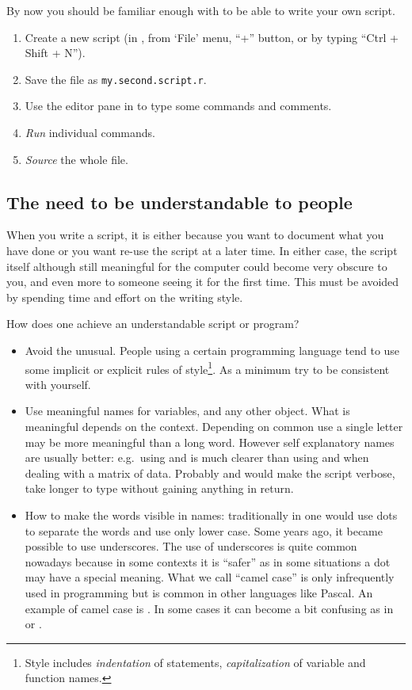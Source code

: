 \documentclass[krantz2]{krantz}\usepackage{knitr}%
\begin{document}
\begin{playground}
By now you should be familiar enough with \Rlang to be able to write your own script.
\begin{enumerate}
  \item Create a new \Rpgrm script (in \RStudio, from `File' menu, ``+'' button, or by typing ``Ctrl + Shift + N'').
  \item Save the file as \texttt{my.second.script.r}.
  \item Use the editor pane in \RStudio to type some \Rpgrm commands and comments.
  \item \emph{Run} individual commands.
  \item \emph{Source} the whole file.
\end{enumerate}
\end{playground}

\subsection{The need to be understandable to people}\label{sec:script:readability}

When you write a script, it is either because you want to document what you have done or you want re-use the script at a later time. In either case, the script itself although still meaningful for the computer could become very obscure to you, and even more to someone seeing it for the first time. This must be avoided by spending time and effort on the writing style.

How does one achieve an understandable script or program?
\begin{itemize}
  \item Avoid the unusual. People using a certain programming language tend to use some implicit or explicit rules of style\footnote{Style includes \textit{indentation} of statements, \textit{capitalization} of variable and function names.}. As a minimum try to be consistent with yourself.
  \item Use meaningful names for variables, and any other object. What is meaningful depends on the context. Depending on common use a single letter may be more meaningful than a long word. However self explanatory names are usually better: e.g.\ using  and  is much clearer than using  and  when dealing with a matrix of data. Probably  and  would make the script verbose, take longer to type without gaining anything in return.
  \item How to make the words visible in names: traditionally in \Rlang one would use dots to separate the words and use only lower case. Some years ago, it became possible to use underscores. The use of underscores is quite common nowadays because in some contexts it is ``safer'' as in some situations a dot may have a special meaning. What we call ``camel case'' is only infrequently used in \Rlang programming but is common in other languages like Pascal. An example of camel case is . In some cases it can become a bit confusing as in  or .
\end{itemize}
\end{document}

